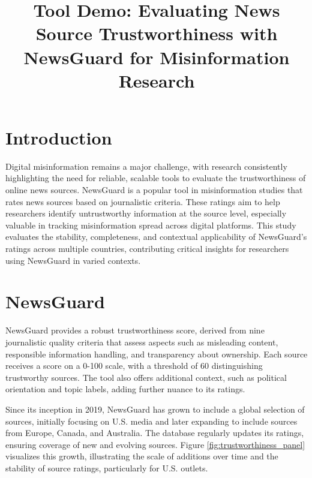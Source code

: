 \documentclass{article}
\title{Tool Demo: Evaluating News Source Trustworthiness with NewsGuard for Misinformation Research}
\begin{document}
\maketitle

\section{Introduction}
Digital misinformation remains a major challenge, with research consistently highlighting the need for reliable, scalable tools to evaluate the trustworthiness of online news sources. 
NewsGuard is a popular tool in misinformation studies that rates news sources based on journalistic criteria. 
These ratings aim to help researchers identify untrustworthy information at the source level, especially valuable in tracking misinformation spread across digital platforms. 
This study evaluates the stability, completeness, and contextual applicability of NewsGuard’s ratings across multiple countries, contributing critical insights for researchers using NewsGuard in varied contexts.


\section{NewsGuard}
NewsGuard provides a robust trustworthiness score, derived from nine journalistic quality criteria that assess aspects such as misleading content, responsible information handling, and transparency about ownership. 
Each source receives a score on a 0-100 scale, with a threshold of 60 distinguishing trustworthy sources. 
The tool also offers additional context, such as political orientation and topic labels, adding further nuance to its ratings.

Since its inception in 2019, NewsGuard has grown to include a global selection of sources, initially focusing on U.S. media and later expanding to include sources from Europe, Canada, and Australia. 
The database regularly updates its ratings, ensuring coverage of new and evolving sources. 
Figure \ref{fig:trustworthiness_panel} visualizes this growth, illustrating the scale of additions over time and the stability of source ratings, particularly for U.S. outlets.
\end{document}
